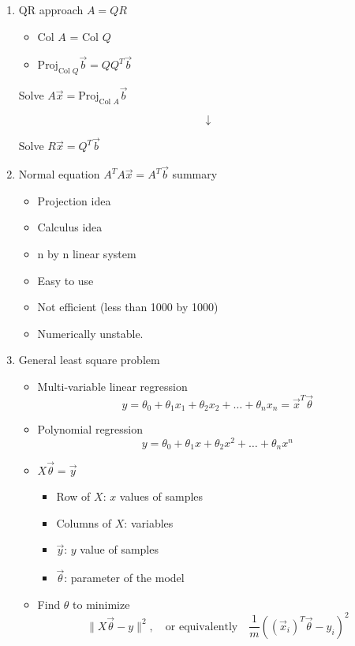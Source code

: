 \documentclass{article}
\theoremstyle{remark}
\begin{document}
\begin{enumerate}
\item QR approach
$A = QR$
\begin{itemize}
\item Col $A$ = Col $Q$
\item $\displaystyle \text{Proj}_{\text{Col }Q} \vec b = QQ^T \vec b$
\end{itemize}
\begin{center}
Solve $A\vec x = \displaystyle \text{Proj}_{\text{Col }A} \vec b$
\end{center}
$$
\downarrow
$$
\begin{center}
Solve $R\vec x = Q^T\vec b$
\end{center}

\item Normal equation $A^TA\vec x = A^T \vec b$ summary
\begin{itemize}
\item Projection idea
\item Calculus idea
\item n by n linear system
\item Easy to use
\item Not efficient (less than 1000 by 1000)
\item Numerically unstable.
\end{itemize}

\item General least square problem
\begin{itemize}
\item Multi-variable linear regression
$$
y = \theta_0 + \theta_1x_1+\theta_2x_2+\dots+\theta_nx_n  = \vec x^T\vec \theta
$$
\item Polynomial regression
$$
y = \theta_0 + \theta_1x+\theta_2x^2+\dots+\theta_nx^n$$
\item $X\vec \theta = \vec y $
\begin{itemize}
\item Row of $X$: $x$ values of samples
\item Columns of $X$: variables
\item $\vec y $: $y$ value of samples
\item $\vec \theta$: parameter of the model
\end{itemize}
\item Find $\theta$ to minimize 
$$
\|X\vec \theta- y\|^2, \quad \text{or equivalently}\quad \frac{1}{m}((\vec x_i)^T\vec \theta-y_i)^2
$$
\end{itemize}


\end{enumerate}
\end{document}
